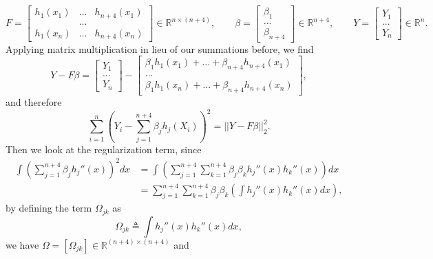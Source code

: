 \begin{equation}
    F = \begin{bmatrix} 
             h_1(x_1) & ... & h_{n+4}(x_1) \\ 
             & ... & \\
             h_{1}(x_n) & ... & h_{n+4}(x_n)
        \end{bmatrix} \in \mathbb{R}^{n \times (n+4)}, \qquad
    \beta = \begin{bmatrix} \beta_1 \\ ... \\ \beta_{n+4} \end{bmatrix} \in \mathbb{R}^{n+4}, \qquad 
    Y = \begin{bmatrix} Y_1 \\ ... \\ Y_n \end{bmatrix} \in \mathbb{R}^{n}.
\end{equation}
Applying matrix multiplication in lieu of our summations before, we find
\begin{equation*}
    Y - F \beta = \begin{bmatrix} Y_1 \\ ... \\ Y_n \end{bmatrix} - \begin{bmatrix} \beta_1h_1(x_1) + ... + \beta_{n+4}h_{n+4}(x_1) \\ ... \\ \beta_1h_1(x_n) + ... + \beta_{n+4}h_{n+4}(x_n) \end{bmatrix},
\end{equation*}
and therefore
\begin{equation*}
    \sum_{i=1}^n \left(Y_i - \sum_{j=1}^{n+4} \beta_jh_j(X_i)\right)^2 = ||Y - F\beta||_2^2.
\end{equation*}
Then we look at the regularization term, since
\begin{align*}
    \int \left( \sum_{j=1}^{n+4} \beta_jh_j''(x) \right)^2dx & = \int \left( \sum_{j=1}^{n+4} \sum_{k=1}^{n+4} \beta_j\beta_k h_j''(x) h_k''(x) \right)dx \\
    &= \sum_{j=1}^{n+4}\sum_{k=1}^{n+4} \beta_j\beta_k \left( \int h_j''(x)h_k''(x)dx \right),
\end{align*}
by defining the term $\Omega_{jk}$ as
\begin{equation*}
    \Omega_{jk} \triangleq \int h_j''(x)h_k''(x)dx,
\end{equation*}
we have $\Omega = [\Omega_{jk}] \in \mathbb{R}^{(n+4)\times(n+4)}$ and
